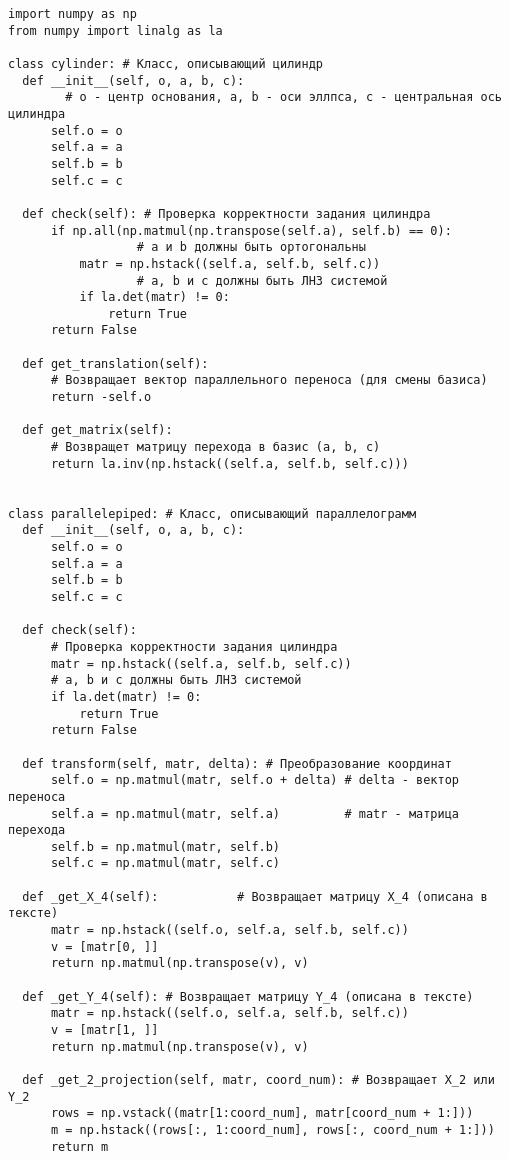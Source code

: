 \documentclass[pdftex,ptm,12pt,a4paper]{report}
\begin{document}
\begin{verbatim}
import numpy as np
from numpy import linalg as la

class cylinder: # Класс, описывающий цилиндр
  def __init__(self, o, a, b, c):
        # o - центр основания, a, b - оси эллпса, c - центральная ось цилиндра
      self.o = o
      self.a = a
      self.b = b
      self.c = c

  def check(self): # Проверка корректности задания цилиндра
      if np.all(np.matmul(np.transpose(self.a), self.b) == 0):
                  # a и b должны быть ортогональны
          matr = np.hstack((self.a, self.b, self.c))
                  # a, b и c должны быть ЛНЗ системой
          if la.det(matr) != 0:
              return True
      return False

  def get_translation(self):
      # Возвращает вектор параллельного переноса (для смены базиса)
      return -self.o

  def get_matrix(self):
      # Возвращет матрицу перехода в базис (a, b, c)
      return la.inv(np.hstack((self.a, self.b, self.c)))


class parallelepiped: # Класс, описывающий параллелограмм
  def __init__(self, o, a, b, c):
      self.o = o
      self.a = a
      self.b = b
      self.c = c

  def check(self):
      # Проверка корректности задания цилиндра
      matr = np.hstack((self.a, self.b, self.c))
      # a, b и c должны быть ЛНЗ системой
      if la.det(matr) != 0:
          return True
      return False

  def transform(self, matr, delta): # Преобразование координат
      self.o = np.matmul(matr, self.o + delta) # delta - вектор переноса
      self.a = np.matmul(matr, self.a)         # matr - матрица перехода
      self.b = np.matmul(matr, self.b)
      self.c = np.matmul(matr, self.c)

  def _get_X_4(self):           # Возвращает матрицу X_4 (описана в тексте)
      matr = np.hstack((self.o, self.a, self.b, self.c))
      v = [matr[0, ]]
      return np.matmul(np.transpose(v), v)

  def _get_Y_4(self): # Возвращает матрицу Y_4 (описана в тексте)
      matr = np.hstack((self.o, self.a, self.b, self.c))
      v = [matr[1, ]]
      return np.matmul(np.transpose(v), v)

  def _get_2_projection(self, matr, coord_num): # Возвращает X_2 или Y_2
      rows = np.vstack((matr[1:coord_num], matr[coord_num + 1:]))
      m = np.hstack((rows[:, 1:coord_num], rows[:, coord_num + 1:]))
      return m


\end{verbatim}
\end{document}
